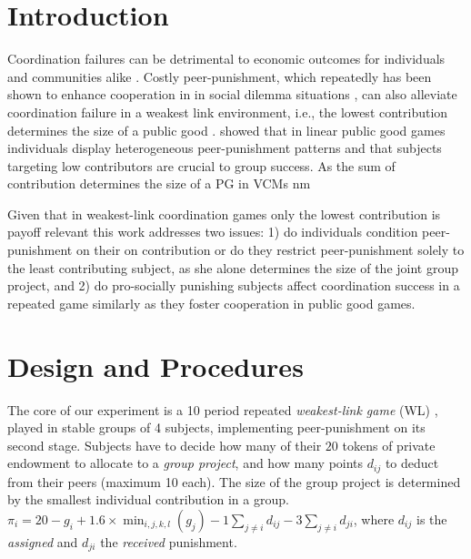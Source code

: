 \documentclass[11pt,a4paper]{article}
\begin{document}
\begin{refsection}

\section{Introduction}


Coordination failures can be detrimental to economic outcomes for individuals
and communities alike \parencite[e.g.,][]{Huyck1990,Brandts2006}. 
Costly peer-punishment, which repeatedly has been
shown to enhance cooperation in in social dilemma
situations \parencite[e.g.,][]{Fehr2002d}, can also alleviate
coordination failure in a weakest link environment, i.e., the lowest
contribution determines the size of a public good \parencite{Lec2015}.
\cite{Albrecht2016a} showed that in linear public good games individuals display
heterogeneous peer-punishment patterns and that subjects targeting low
contributors are crucial to group success.
As the sum of contribution determines the size of a PG in VCMs  nm

Given that in weakest-link coordination games only the lowest contribution is
payoff relevant this work addresses two issues: 1) do individuals condition
peer-punishment on their on contribution or do they
restrict peer-punishment solely to the least contributing subject, as she alone
determines the size of the joint group project, and 2) do pro-socially punishing
subjects affect coordination success in a repeated game similarly as they foster
cooperation in public good games.

\section{Design and Procedures}

The core of our experiment is a 10 period repeated \emph{weakest-link game}
(WL)
, played in stable groups of 4 subjects, implementing peer-punishment
on its second stage. Subjects have to decide how many of their
$20$ tokens of private endowment to allocate to a \emph{group project}, and how many
points $d_{ij}$ to deduct from their peers (maximum 10 each). The size of the group project is determined by the smallest individual
contribution in a group. $\pi_i = 20 - g_i + 1.6 \times \min_{i,j,k,l}({g_j}) - 1\sum_{j\neq i}{d_{ij}} - 3\sum_{j\neq
  i}{d_{ji}}$, where $d_{ij}$ is the \emph{assigned} and
$d_{ji}$ the \emph{received} punishment.  


\end{refsection}
\end{document}
